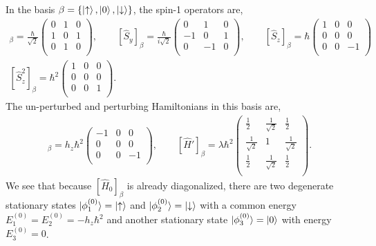 \documentclass[10pt]{article}
\newcommand{\1}{\mathbf 1}
\begin{document}
In the basis $\beta = \{\ket{\uparrow}, \ket{0}, \ket{\downarrow}\}$, the spin-1 operators are,
\begin{gather}
	[\hat S_x]_\beta
	=
	\frac{\hbar}{\sqrt{2}}
	\left(
		\begin{array}{ccc}
		 0 & 1 & 0 \\
		 1 & 0 & 1 \\
		 0 & 1 & 0 \\
		\end{array}
	\right),
	\qquad
	[\hat S_y]_\beta
	=
	\frac{\hbar}{i\sqrt{2}}
	\left(
\begin{array}{ccc}
 0 & 1 & 0 \\
 -1 & 0 & 1 \\
 0 & -1 & 0 \\
\end{array}
\right),
\qquad
[\hat S_z]_\beta
=
\hbar
\left(
\begin{array}{ccc}
 1 & 0 & 0 \\
 0 & 0 & 0 \\
 0 & 0 & -1 \\
\end{array}
\right)\\
[\hat S_z^2]_\beta
=
\hbar^2
\left(
\begin{array}{ccc}
 1 & 0 & 0 \\
 0 & 0 & 0 \\
 0 & 0 & 1 \\
\end{array}
\right).
\end{gather}
The un-perturbed and perturbing Hamiltonians in this basis are,
\begin{align}
	[\hat H_0]_\beta
	=h_z\hbar^2
	\left(
	\begin{array}{ccc}
	 -1 & 0 & 0 \\
	 0 & 0 & 0 \\
	 0 & 0 & -1 \\
	\end{array}
	\right)
	,\qquad
	[\hat H']_\beta
	=
	\lambda
	\hbar^2
	\left(
		\begin{array}{ccc}
		 \frac{1}{2} & \frac{1}{\sqrt{2}} & \frac{1}{2} \\
		 \frac{1}{\sqrt{2}} & 1 & \frac{1}{\sqrt{2}} \\
		 \frac{1}{2} & \frac{1}{\sqrt{2}} & \frac{1}{2} \\
		\end{array}
		\right).
\end{align}
We see that because $[\hat H_0]_\beta$ is already diagonalized, there are two degenerate stationary states $\ket{\phi_1^{(0)}} = \ket{\uparrow}$ and $\ket{\phi_2^{(0)}} =\ket{\downarrow}$ with a common energy $E_1^{(0)} = E_2^{(0)} = -h_z \hbar^2$ and another stationary state $\ket{\phi_3^{(0)}} = \ket{0}$ with energy $E_3^{(0)} = 0$.
\end{document}
